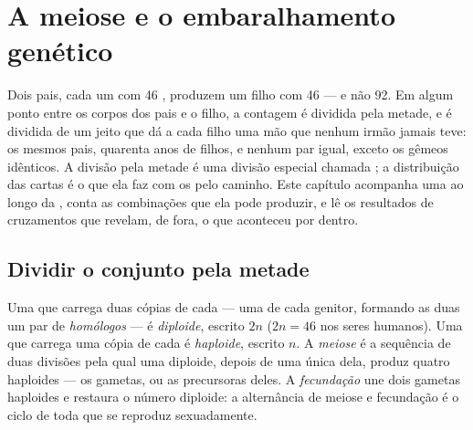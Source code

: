 \chapter{A meiose e o embaralhamento genético}\label{ch:g12:meiosis-genetic-shuffling}

Dois pais, cada um com 46 , produzem um filho com 46 --- e
não 92. Em algum ponto entre os corpos dos pais e o filho, a contagem é
dividida pela metade, e é dividida de um jeito que dá a cada filho uma
mão que nenhum irmão jamais teve: os mesmos pais, quarenta anos de
filhos, e nenhum par igual, exceto os gêmeos idênticos. A divisão pela
metade é uma divisão especial chamada ; a distribuição das cartas
é o que ela faz com os  pelo caminho. Este capítulo
acompanha uma  ao longo da , conta as combinações que ela
pode produzir, e lê os resultados de cruzamentos que revelam, de fora,
o que aconteceu por dentro.

\section{Dividir o conjunto pela metade}

\begin{definition}\label{def:g12:meiosis-genetic-shuffling:meiosis}
Uma  que carrega duas cópias de cada  --- uma de cada
genitor, formando as duas um par de \emph{ homólogos} --- é
\emph{diploide}, escrito $2n$ ($2n = 46$ nos seres
humanos). Uma  que carrega uma cópia de cada é
\emph{haploide}, escrito $n$. A
\emph{meiose} é a sequência de duas divisões pela qual
uma  diploide, depois de uma única  dela,
produz quatro  haploides --- os gametas, ou as precursoras
deles. A \emph{fecundação} une dois gametas haploides e restaura o
número diploide: a alternância de meiose e fecundação é o ciclo de toda
 que se reproduz sexuadamente.
\end{definition}

